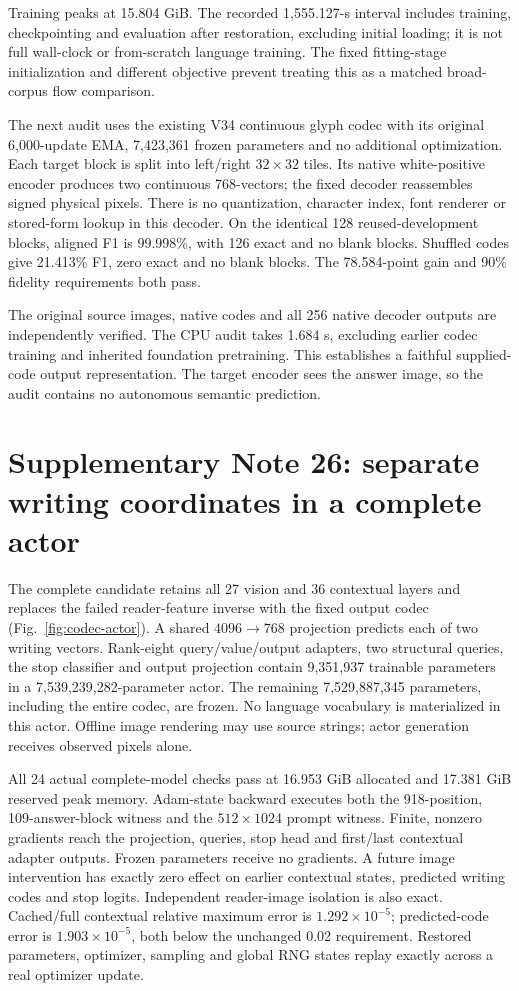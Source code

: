 \documentclass[10pt,a4paper]{article}
\providecommand{\DIFadd}[1]{{\protect\color{blue} \sf #1}} %
\begin{document}
\DIFadd{Training peaks at 15.804 GiB. The recorded 1,555.127-s interval includes
training, checkpointing and evaluation after restoration, excluding initial
loading; it is not full wall-clock or from-scratch language training. The
fixed fitting-stage initialization and different objective prevent treating
this as a matched broad-corpus flow comparison.
}

\DIFadd{The next audit uses the existing V34 continuous glyph codec with its original
6,000-update EMA, 7,423,361 frozen parameters and no additional optimization.
Each target block is split into left/right $32\times32$ tiles. Its native
white-positive encoder produces two continuous 768-vectors; the fixed decoder
reassembles signed physical pixels. There is no quantization, character index,
font renderer or stored-form lookup in this decoder. On the identical 128
reused-development blocks, aligned F1 is 99.998\%, with 126 exact and no blank
blocks. Shuffled codes give 21.413\% F1, zero exact and no blank blocks.
The 78.584-point gain and 90\% fidelity requirements both pass.
}

\DIFadd{The original source images, native codes and all 256 native decoder outputs
are independently verified. The CPU audit takes 1.684 s, excluding earlier
codec training and inherited foundation pretraining. This establishes a
faithful supplied-code output representation. The target encoder sees the
answer image, so the audit contains no autonomous semantic prediction.
}

\section*{\DIFadd{Supplementary Note 26: separate writing coordinates in a complete actor}}
\DIFadd{The complete candidate retains all 27 vision and 36 contextual layers and
replaces the failed reader-feature inverse with the fixed output codec
(Fig.~\ref{fig:codec-actor}). A shared $4096\to768$ projection predicts each
of two writing vectors. Rank-eight query/value/output adapters, two structural
queries, the stop classifier and output projection contain 9,351,937 trainable
parameters in a 7,539,239,282-parameter actor. The remaining 7,529,887,345
parameters, including the entire codec, are frozen. No language vocabulary is
materialized in this actor. Offline image rendering may use source strings;
actor generation receives observed pixels alone.
}

\DIFadd{All 24 actual complete-model checks pass at 16.953 GiB allocated and 17.381 GiB
reserved peak memory. Adam-state backward executes both the 918-position,
109-answer-block witness and the $512\times1024$ prompt witness. Finite,
nonzero gradients reach the projection, queries, stop head and first/last
contextual adapter outputs. Frozen parameters receive no gradients. A future
image intervention has exactly zero effect on earlier contextual states,
predicted writing codes and stop logits. Independent reader-image isolation
is also exact. Cached/full contextual relative maximum error is
$1.292\times10^{-5}$; predicted-code error is $1.903\times10^{-5}$, both below
the unchanged 0.02 requirement. Restored parameters, optimizer, sampling and
global RNG states replay exactly across a real optimizer update.
}
\end{document}
